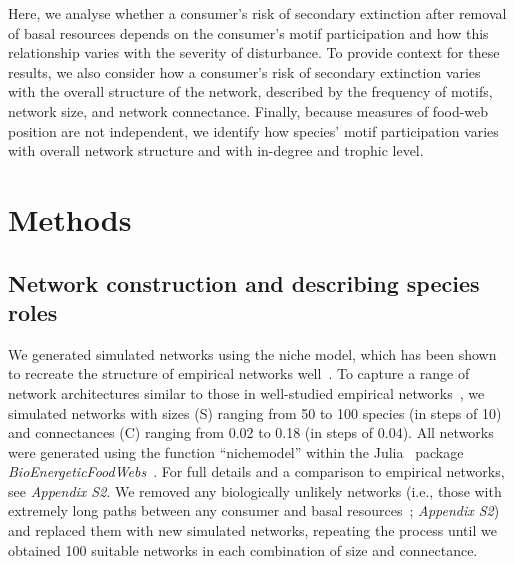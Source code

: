 \documentclass[12pt]{article}
\begin{document}
\begin{spacing}{2.0}
    
    Here, we analyse whether a consumer's risk of secondary extinction after removal of basal resources depends on the consumer's motif participation and how this relationship varies with the severity of disturbance.
    To provide context for these results, we also consider how a consumer's risk of secondary extinction varies with the overall structure of the network, described by the frequency of motifs, network size, and network connectance.
    Finally, because measures of food-web position are not independent, we identify how species' motif participation varies with overall network structure and with in-degree and trophic level.


\section*{Methods}

    \subsection*{Network construction and describing species roles}

        We generated simulated networks using the niche model, which has been shown to recreate the structure of empirical networks well~\citep{Williams2000,Stouffer2007}.
        To capture a range of network architectures similar to those in well-studied empirical networks~\citep{Dunne2002,Dunne2002e}, we simulated networks with sizes (S) ranging from 50 to 100 species (in steps of 10) and connectances (C) ranging from 0.02 to 0.18 (in steps of 0.04). 
        All networks were generated using the function ``nichemodel'' within the Julia~\citep{Bezanson2017julia} package \emph{BioEnergeticFoodWebs}~\citep{bioenergfw,Delmas2017}.   
        For full details and a comparison to empirical networks, see \emph{Appendix S2}.
        We removed any biologically unlikely networks (i.e., those with extremely long paths between any consumer and basal resources~\citep{Borrelli2014}; \emph{Appendix S2}) and replaced them with new simulated networks, repeating the process until we obtained 100 suitable networks in each combination of size and connectance.


\end{spacing}
\end{document}
